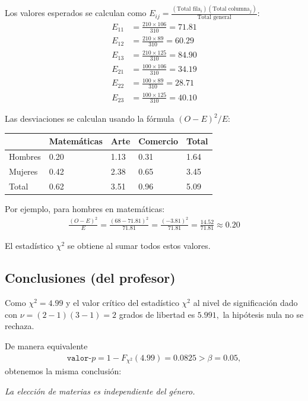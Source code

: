 Los valores esperados se calculan como $E_{ij} = \frac{(\text{Total fila}_i)(\text{Total columna}_j)}{\text{Total general}}$:
\begin{align}
	E_{11} &= \frac{210 \times 106}{310} = 71.81 \\
	E_{12} &= \frac{210 \times 89}{310} = 60.29 \\
	E_{13} &= \frac{210 \times 125}{310} = 84.90 \\
	E_{21} &= \frac{100 \times 106}{310} = 34.19 \\
	E_{22} &= \frac{100 \times 89}{310} = 28.71 \\
	E_{23} &= \frac{100 \times 125}{310} = 40.10
\end{align}



Las desviaciones se calculan usando la fórmula $(O-E)^2/E$:
\begin{center}
	\begin{tabular}{|l|l|l|l|l|}\hline
		& Matemáticas & Arte & Comercio & Total\\\hline
		Hombres & 0.20 & 1.13 & 0.31 & 1.64\\\hline
		Mujeres & 0.42 & 2.38 & 0.65 & 3.45\\\hline
		Total & 0.62 & 3.51 & 0.96 & 5.09\\\hline
	\end{tabular}
\end{center}

Por ejemplo, para hombres en matemáticas:
\begin{align}
	\frac{(O-E)^2}{E} = \frac{(68-71.81)^2}{71.81} = \frac{(-3.81)^2}{71.81} = \frac{14.52}{71.81} \approx 0.20
\end{align}

El estadístico $\chi^{2}$ se obtiene al sumar todos estos valores.

\subsection{Conclusiones (del profesor)}
Como $\chi^{2}= 4.99$ y el valor crítico del estadístico $\chi^{2}$ al nivel de significación dado con $\nu=(2-1)(3-1)=2$ grados de libertad es $5.991,$ la hipótesis nula no se rechaza.

De manera equivalente
\begin{align}
	\texttt{valor-}p=1- F_{\chi^{2}}(4.99)=0.0825>\beta=0.05,
\end{align}
obtenemos la misma conclusión:
\begin{center}
	\emph{La elección de materias es independiente del género.}
\end{center}

